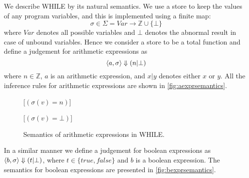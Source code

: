 We describe WHILE by its natural semantics.
We use a store to keep the values of any program variables, and this is implemented using a finite map:
$$\sigma \in \Sigma = Var \longrightarrow \mathbb{Z} \cup \{\bot\}$$
where $Var$ denotes all possible variables and $\bot$ denotes the abnormal result in case of unbound variables.
Hence we consider a store to be a total function and define a judgement for arithmetic expressions as
\[
  \langle a,\sigma \rangle \Downarrow (n | \bot)
\]
where $n \in \mathbb{Z}$, $a$ is an arithmetic expression, and $x | y$ denotes either $x$ or $y$.
All the inference rules for arithmetic expressions are shown in \autoref{fig:aexprsemantics}.

\begin{figure}[h!]
\inference[EACst]{}
{}

\inference[EAVar]{}
{}[$(\sigma(v) = n)$]

{}[$( \sigma(v) = \bot )$]

{}

{}

{}

\caption{Semantics of arithmetic expressions in WHILE.}
\label{fig:aexprsemantics}
\end{figure}

In a similar manner we define a judgement for boolean expressions as $\langle b,\sigma \rangle \Downarrow (t | \bot)$, where $t \in \{true, false\}$ and $b$ is a boolean expression.
The semantics for boolean expressions are presented in \autoref{fig:bexprsemantics}.

